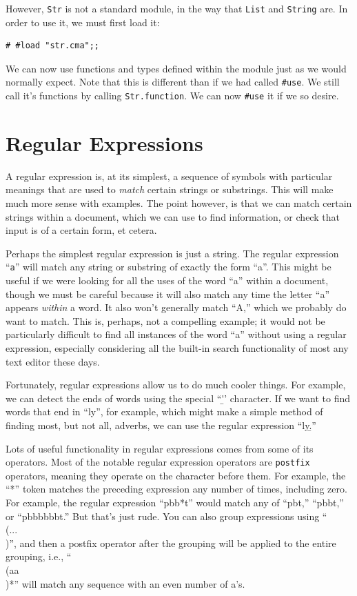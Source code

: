 \documentclass[10pt]{book}
\begin{document}
{However, {\tt Str} is not a standard module, in the way that {\tt List} and {\tt String} are. In order to use it, we must first load it:
\beforeverb
\begin{verbatim}
# #load "str.cma";;
\end{verbatim}
\afterverb

We can now use functions and types defined within the module just as we would normally expect. Note that this is different than if we had called {\tt \#use}. We still call it's functions by calling {\tt Str.function}. We can now {\tt \#use} it if we so desire.

\section{Regular Expressions}

A regular expression is, at its simplest, a sequence of symbols with particular meanings that are used to {\em match} certain strings or substrings. This will make much more sense with examples. The point however, is that we can match certain strings within a document, which we can use to find information, or check that input is of a certain form, et cetera.

Perhaps the simplest regular expression is just a string. The regular expression ``{\tt a}'' will match any string or substring of exactly the form ``a''. This might be useful if we were looking for all the uses of the word ``a'' within a document, though we must be careful because it will also match any time the letter ``a'' appears {\it within} a word. It also won't generally match ``A,'' which we probably do want to match. This is, perhaps, not a compelling example; it would not be particularly difficult to find all instances of the word ``a'' without using a regular expression, especially considering all the built-in search functionality of most any text editor these days.

Fortunately, regular expressions allow us to do much cooler things. For example, we can detect the ends of words using the special ``\b'' character. If we want to find words that end in ``ly'', for example, which might make a simple method of finding most, but not all, adverbs, we can use the regular expression ``ly\b.''

Lots of useful functionality in regular expressions comes from some of its operators. Most of the notable regular expression operators are {\tt postfix} operators, meaning they operate on the character before them. For example, the ``*'' token matches the preceding expression any number of times, including zero. For example, the regular expression ``pbb*t'' would match any of ``pbt,'' ``pbbt,'' or ``pbbbbbbt.'' But that's just rude. You can also group expressions using ``\\(... \\)'', and then a postfix operator after the grouping will be applied to the entire grouping, i.e., ``\\(aa\\)*'' will match any sequence with an even number of a's.

}
\end{document}
